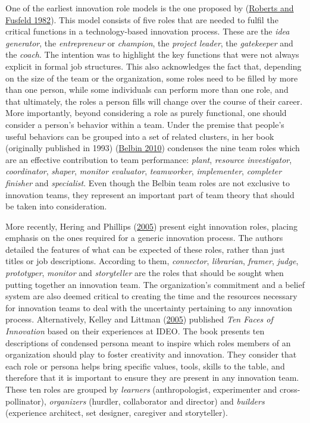 \documentclass[AMA,STIX1COL,APA,STIX2COL]{WileyNJD-v2}
\begin{document}
One of the earliest innovation role models is the one proposed by
(\protect\hyperlink{ref-Roberts1982}{Roberts and Fusfeld 1982}). This
model consists of five roles that are needed to fulfil the critical
functions in a technology-based innovation process. These are the
\emph{idea generator}, the \emph{entrepreneur} or \emph{champion}, the
\emph{project leader}, the \emph{gatekeeper} and the \emph{coach}. The
intention was to highlight the key functions that were not always
explicit in formal job structures. This also acknowledges the fact that,
depending on the size of the team or the organization, some roles need
to be filled by more than one person, while some individuals can perform
more than one role, and that ultimately, the roles a person fills will
change over the course of their career. More importantly, beyond
considering a role as purely functional, one should consider a person's
behavior within a team. Under the premise that people's useful behaviors
can be grouped into a set of related clusters, in her book (originally
published in 1993) (\protect\hyperlink{ref-Belbin2010}{Belbin 2010})
condenses the nine team roles which are an effective contribution to
team performance: \emph{plant}, \emph{resource investigator},
\emph{coordinator}, \emph{shaper}, \emph{monitor evaluator},
\emph{teamworker}, \emph{implementer}, \emph{completer finisher} and
\emph{specialist}. Even though the Belbin team roles are not exclusive
to innovation teams, they represent an important part of team theory
that should be taken into consideration.

More recently, Hering and Phillips
(\protect\hyperlink{ref-Hering2005}{2005}) present eight innovation
roles, placing emphasis on the ones required for a generic innovation
process. The authors detailed the features of what can be expected of
these roles, rather than just titles or job descriptions. According to
them, \emph{connector}, \emph{librarian}, \emph{framer}, \emph{judge},
\emph{prototyper}, \emph{monitor} and \emph{storyteller} are the roles
that should be sought when putting together an innovation team. The
organization's commitment and a belief system are also deemed critical
to creating the time and the resources necessary for innovation teams to
deal with the uncertainty pertaining to any innovation process.
Alternatively, Kelley and Littman
(\protect\hyperlink{ref-Kelley2005}{2005}) published \emph{Ten Faces of
Innovation} based on their experiences at IDEO. The book presents ten
descriptions of condensed persona meant to inspire which roles members
of an organization should play to foster creativity and innovation. They
consider that each role or persona helps bring specific values, tools,
skills to the table, and therefore that it is important to ensure they
are present in any innovation team. These ten roles are grouped by
\emph{learners} (anthropologist, experimenter and cross-pollinator),
\emph{organizers} (hurdler, collaborator and director) and
\emph{builders} (experience architect, set designer, caregiver and
storyteller).
\end{document}
